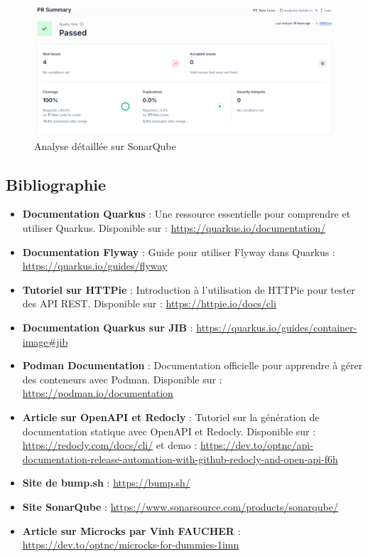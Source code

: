 \documentclass[11pt]{article}
\begin{document}
		\begin{figure}[H] \centering \includegraphics[width=\textwidth]{asset/analyse_sonarq.png} \caption{Analyse détaillée sur SonarQube} \label{fig:sonarq}\end{figure}
		\subsection{Bibliographie}
		\begin{itemize}
			\item \textbf{Documentation Quarkus} : Une ressource essentielle pour comprendre et utiliser Quarkus. Disponible sur : \url{https://quarkus.io/documentation/}
			\item \textbf{Documentation Flyway} : Guide pour utiliser Flyway dans Quarkus : \url{https://quarkus.io/guides/flyway}
			\item \textbf{Tutoriel sur HTTPie} : Introduction à l'utilisation de HTTPie pour tester des API REST. Disponible sur : \url{https://httpie.io/docs/cli}
			\item\textbf{Documentation Quarkus sur JIB} : \url{https://quarkus.io/guides/container-image#jib}
			\item \textbf{Podman Documentation} : Documentation officielle pour apprendre à gérer des conteneurs avec Podman. Disponible sur : \url{https://podman.io/documentation}
			\item \textbf{Article sur OpenAPI et Redocly} : Tutoriel sur la génération de documentation statique avec OpenAPI et Redocly. Disponible sur : \url{https://redocly.com/docs/cli/} et demo : \url{https://dev.to/optnc/api-documentation-release-automation-with-github-redocly-and-open-api-f6h}
			\item \textbf {Site de bump.sh} : \url{https://bump.sh/}
			\item \textbf{Site SonarQube} : \url{https://www.sonarsource.com/products/sonarqube/}
			\item \textbf{Article sur Microcks par Vinh FAUCHER} : \url{https://dev.to/optnc/microcks-for-dummies-1imn}
			
		\end{itemize}
		
	
\end{document}
